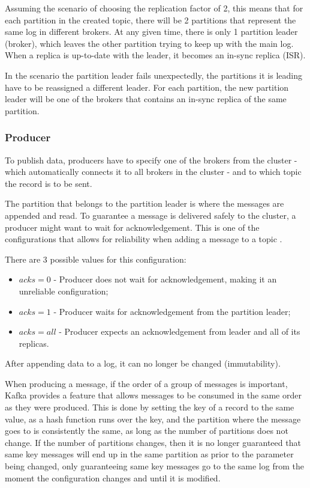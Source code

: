 Assuming the scenario of choosing the replication factor of 2, this means that for each partition in the created topic, there will be 2 partitions that represent the same log in different brokers. At any given time, there is only 1 partition leader (broker), which leaves the other partition trying to keep up with the main log. When a replica is up-to-date with the leader, it becomes an in-sync replica (ISR).


In the scenario the partition leader fails unexpectedly, the partitions it is leading have to be reassigned a different leader. For each partition, the new partition leader will be one of the brokers that contains an in-sync replica of the same partition.

\subsubsection{Producer}

To publish data, producers have to specify one of the brokers from the cluster - which automatically connects it to all brokers in the cluster - and to which topic the record is to be sent.

The partition that belongs to the partition leader is where the messages are appended and read. To guarantee a message is delivered safely to the cluster, a producer might want to wait for acknowledgement. This is one of the configurations that allows for reliability when adding a message to a topic \cite{KafkaProducer}. 

There are 3 possible values for this configuration:
\begin{itemize}
    \item $acks=0$ - Producer does not wait for acknowledgement, making it an unreliable configuration;
    \item $acks=1$ - Producer waits for acknowledgement from the partition leader;
    \item $acks=all$ - Producer expects an acknowledgement from leader and all of its replicas.
\end{itemize}

After appending data to a log, it can no longer be changed (immutability).

When producing a message, if the order of a group of messages is important, Kafka provides a feature that allows messages to be consumed in the same order as they were produced. This is done by setting the key of a record to the same value, as a hash function runs over the key, and the partition where the message goes to is consistently the same, as long as the number of partitions does not change. If the number of partitions changes, then it is no longer guaranteed that same key messages will end up in the same partition as prior to the parameter being changed, only guaranteeing same key messages go to the same log from the moment the configuration changes and until it is modified.

